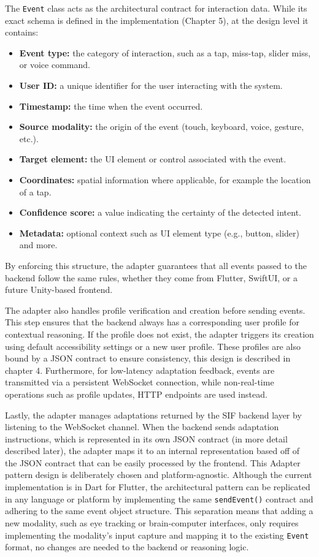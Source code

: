 \documentclass[openany]{book}
\begin{document}
The \texttt{Event} class acts as the architectural contract for interaction data. While its exact schema is defined in the implementation (Chapter 5), at the design level it contains:
\begin{itemize}
    \item \textbf{Event type:}  the category of interaction, such as a tap, miss-tap, slider miss, or voice command.
    \item \textbf{User ID:} a unique identifier for the user interacting with the system.
    \item \textbf{Timestamp:} the time when the event occurred.
    \item \textbf{Source modality:} the origin of the event (touch, keyboard, voice, gesture, etc.).
    \item \textbf{Target element:} the UI element or control associated with the event.
    \item \textbf{Coordinates:} spatial information where applicable, for example the location of a tap.
    \item \textbf{Confidence score:} a value indicating the certainty of the detected intent.
    \item \textbf{Metadata:} optional context such as UI element type (e.g., button, slider) and more.
\end{itemize}
By enforcing this structure, the adapter guarantees that all events passed to the backend follow the same rules, whether they come from Flutter, SwiftUI, or a future Unity-based frontend.

The adapter also handles profile verification and creation before sending events. This step ensures that the backend always has a corresponding user profile for contextual reasoning. If the profile does not exist, the adapter triggers its creation using default accessibility settings or a new user profile. These profiles are also bound by a JSON contract to ensure consistency, this design is described in chapter 4. Furthermore, for low-latency adaptation feedback, events are transmitted via a persistent WebSocket connection, while non-real-time operations such as profile updates, HTTP endpoints are used instead.

Lastly, the adapter manages adaptations returned by the SIF backend layer by listening to the WebSocket channel. When the backend sends adaptation instructions, which is represented in its own JSON contract (in more detail described later), the adapter maps it to an internal representation based off of the JSON contract that can be easily processed by the frontend. This Adapter pattern design is deliberately chosen and platform-agnostic. Although the current implementation is in Dart for Flutter, the architectural pattern can be replicated in any language or platform by implementing the same \texttt{sendEvent()} contract and adhering to the same event object structure. This separation means that adding a new modality, such as eye tracking or brain-computer interfaces, only requires implementing the modality’s input capture and mapping it to the existing \texttt{Event} format, no changes are needed to the backend or reasoning logic.
\end{document}
